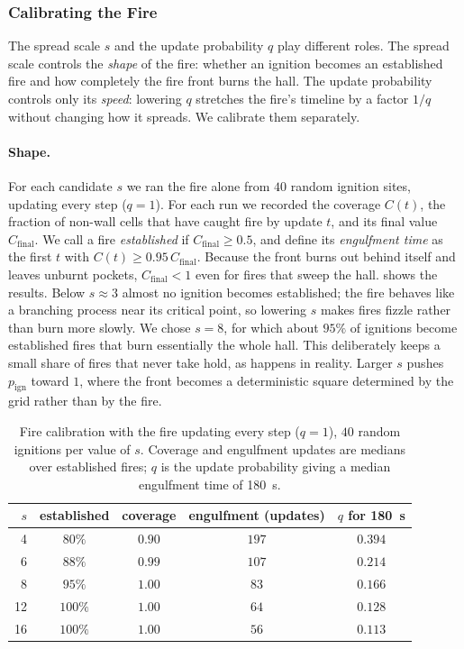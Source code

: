 \subsubsection{Calibrating the Fire}\label{sec:fire_calibration}

The spread scale $s$ and the update probability $q$ play different roles. The spread
scale controls the \emph{shape} of the fire: whether an ignition becomes an established
fire and how completely the fire front burns the hall. The update probability controls
only its \emph{speed}: lowering $q$ stretches the fire's timeline by a factor $1/q$
without changing how it spreads. We calibrate them separately.

\paragraph{Shape.} For each candidate $s$ we ran the fire alone from $40$ random ignition
sites, updating every step ($q = 1$). For each run we recorded the coverage $C(t)$, the
fraction of non-wall cells that have caught fire by update $t$, and its final value
$C_{\text{final}}$. We call a fire \emph{established} if $C_{\text{final}} \ge 0.5$, and
define its \emph{engulfment time} as the first $t$ with
$C(t) \ge 0.95\, C_{\text{final}}$. Because the front burns out behind itself and leaves
unburnt pockets, $C_{\text{final}} < 1$ even for fires that sweep the hall.
 shows the results. Below $s \approx 3$ almost no ignition
becomes established; the fire behaves like a branching process near its critical point,
so lowering $s$ makes fires fizzle rather than burn more slowly. We chose $s = 8$, for
which about $95\%$ of ignitions become established fires that burn essentially the whole
hall. This deliberately keeps a small share of fires that never take hold, as happens in
reality. Larger $s$ pushes $p_{\text{ign}}$ toward $1$, where the front becomes a
deterministic square determined by the grid rather than by the fire.

\begin{table}[H]
  \centering
  \caption{Fire calibration with the fire updating every step ($q = 1$), $40$ random
  ignitions per value of $s$. Coverage and engulfment updates are medians over
  established fires; $q$ is the update probability giving a median engulfment time of
  \SI{180}{s}.}
  \label{tab:fire_calibration}
  \begin{tabular}{rcccc}
    \toprule
    $s$ & established & coverage & engulfment (updates) & $q$ for \SI{180}{s} \\
    \midrule
    4  & $80\%$  & $0.90$ & $197$ & $0.394$ \\
    6  & $88\%$  & $0.99$ & $107$ & $0.214$ \\
    8  & $95\%$  & $1.00$ & $83$  & $0.166$ \\
    12 & $100\%$ & $1.00$ & $64$  & $0.128$ \\
    16 & $100\%$ & $1.00$ & $56$  & $0.113$ \\
    \bottomrule
  \end{tabular}
\end{table}

